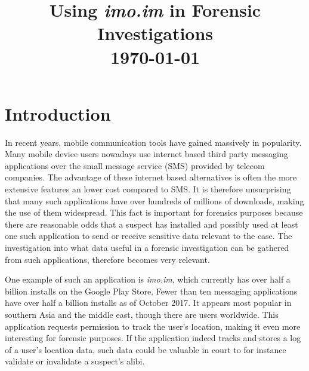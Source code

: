 \documentclass[conference]{IEEEtran}
\begin{document}
\title{Using {\it imo.im} in Forensic Investigations \\\vspace{5mm} \large  \today}
\author{
\and
{}
}
\maketitle
\thispagestyle{plain}
\pagestyle{plain}


\section{Introduction}

In recent years, mobile communication tools have gained massively in popularity.
Many mobile device users nowadays use internet based third party messaging
applications over the small message service (SMS) provided by telecom companies.
The advantage of these internet based alternatives is often the more extensive
features an lower cost compared to SMS. It is therefore unsurprising that many
such applications have over hundreds of millions of downloads, making the use of
them widespread. This fact is important for forensics purposes because there are
reasonable odds that a suspect has installed and possibly used at least one such
application to send or receive sensitive data relevant to the case. The
investigation into what data useful in a forensic investigation can be gathered
from such applications, therefore becomes very relevant.

One example of such an application is {\it imo.im}, which currently has over
half a billion installs on the Google Play Store. Fewer than ten messaging
applications have over half a billion installs as of October
2017\cite{wiki-gplay-popular}. It appears most popular in southern Asia and the
middle east, though there are users worldwide\footnotemark. This application
requests permission to track the user's location, making it even more
interesting for forensic purposes. If the application indeed tracks and stores
a log of a user's location data, such data could be valuable in court to for
instance validate or invalidate a suspect's alibi.
\end{document}

